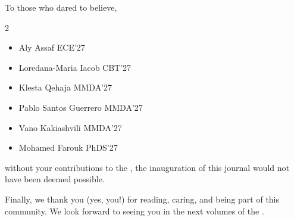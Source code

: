 To those who dared to believe,
\begin{multicols}{2}
\begin{itemize}
  \item Aly Assaf {\color{smjgray}ECE'27}
  \item Loredana-Maria Iacob {\color{smjgray}CBT'27}
  \item Klesta Qehaja {\color{smjgray}MMDA'27}
  \item Pablo Santos Guerrero {\color{smjgray}MMDA'27}
  \item Vano Kakiashvili {\color{smjgray}MMDA'27}
  \item Mohamed Farouk {\color{smjgray}PhDS'27}
\end{itemize} 
\end{multicols}

without your contributions to the \UgS, the inauguration of this journal would not have been deemed possible. 

Finally, we thank you (yes, you!) for reading, caring, and being part of this community. 
We look forward to seeing you in the next volumes of the \SMJ.

\vspace{0.15cm}

\smjgoldline{1.2pt}

\vspace{0.6cm}
\newpage